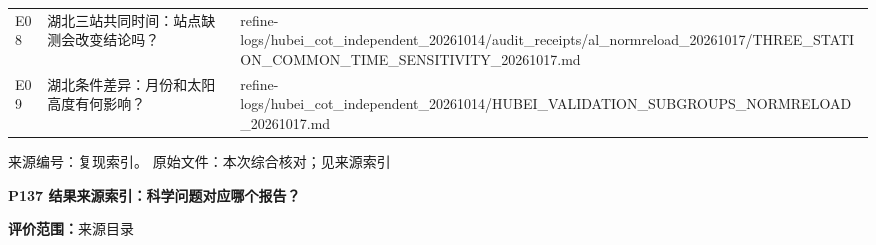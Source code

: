 \documentclass[UTF8,a4paper,landscape,10pt]{ctexart}
\begin{document}
\begin{center}
\begin{adjustbox}{max totalheight=0.58\textheight,max width=\linewidth}
\begin{minipage}{\linewidth}
\begin{tabularx}{\linewidth}{>{\hsize=0.3000\hsize\raggedright\arraybackslash}X>{\hsize=0.9000\hsize\raggedright\arraybackslash}X>{\hsize=1.8000\hsize\raggedright\arraybackslash}X}
E08 & 湖北三站共同时间：站点缺测会改变结论吗？ & refine-logs/\allowbreak{}hubei\_\allowbreak{}cot\_\allowbreak{}independent\_\allowbreak{}20261014/\allowbreak{}audit\_\allowbreak{}receipts/\allowbreak{}al\_\allowbreak{}normreload\_\allowbreak{}20261017/\allowbreak{}THREE\_\allowbreak{}STATION\_\allowbreak{}COMMON\_\allowbreak{}TIME\_\allowbreak{}SENSITIVITY\_\allowbreak{}20261017.md \\
E09 & 湖北条件差异：月份和太阳高度有何影响？ & refine-logs/\allowbreak{}hubei\_\allowbreak{}cot\_\allowbreak{}independent\_\allowbreak{}20261014/\allowbreak{}HUBEI\_\allowbreak{}VALIDATION\_\allowbreak{}SUBGROUPS\_\allowbreak{}NORMRELOAD\_\allowbreak{}20261017.md \\
\bottomrule\end{tabularx}\end{minipage}\end{adjustbox}\end{center}
\vfill{\scriptsize\color{muted} 来源编号：复现索引。 原始文件：本次综合核对；见来源索引}\par
\clearpage
{\large\bfseries\color{ink} P137  结果来源索引：科学问题对应哪个报告？}\par
{}\par
{\small\color{muted}\textbf{评价范围：}来源目录}\par\vspace{3mm}
\end{document}
